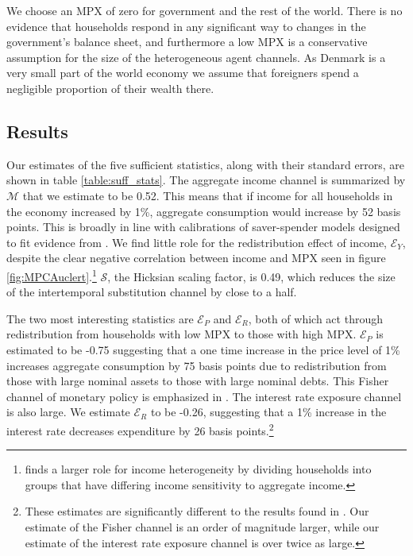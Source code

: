 \documentclass[titlepage]{\econtex}\newcommand{\texname}{ConsumptionHeterogeneity}
\begin{document}
We choose an MPX of zero for government and the rest of the world. There is no evidence that households respond in any significant way to changes in the government's balance sheet, and furthermore a low MPX is a conservative assumption for the size of the heterogeneous agent channels. As Denmark is a very small part of the world economy we assume that foreigners spend a negligible proportion of their wealth there.
\begin{center}
	\label{table:aggElas}
	
\end{center}

\subsection{Results}
Our estimates of the five sufficient statistics, along with their standard errors, are shown in table \ref{table:suff_stats}. The aggregate income channel is summarized by $\mathcal{M}$ that we estimate to be 0.52. This means that if income for all households in the economy increased by 1\%, aggregate consumption would increase by 52 basis points. This is broadly in line with calibrations of saver-spender models designed to fit evidence from \cite{campbell_consumption_1989}. We find little role for the redistribution effect of income, $\mathcal{E}_Y$, despite the clear negative correlation between income and MPX seen in figure \ref{fig:MPCAuclert}.\footnote{\cite{patterson_2019} finds a larger role for income heterogeneity by dividing households into groups that have differing income sensitivity to aggregate income.} $\mathcal{S}$, the Hicksian scaling factor, is 0.49, which reduces the size of the intertemporal substitution channel by close to a half.

The two most interesting statistics are $\mathcal{E}_P$ and $\mathcal{E}_R$, both of which act through redistribution from households with low MPX to those with high MPX. $\mathcal{E}_P$ is estimated to be -0.75 suggesting that a one time increase in the price level of 1\% increases aggregate consumption by 75 basis points due to redistribution from those with large nominal assets to those with large nominal debts. This Fisher channel of monetary policy is emphasized in \cite{doepke_inflation_2006}. The interest rate exposure channel is also large. We estimate  $\mathcal{E}_R$ to be -0.26, suggesting that a 1\% increase in the interest rate decreases expenditure by 26 basis points.\footnote{These estimates are significantly different to the results found in \cite{auclert_monetary_2017}. Our estimate of the Fisher channel is an order of magnitude larger, while our estimate of the interest rate exposure channel is over twice as large.}
\end{document}
